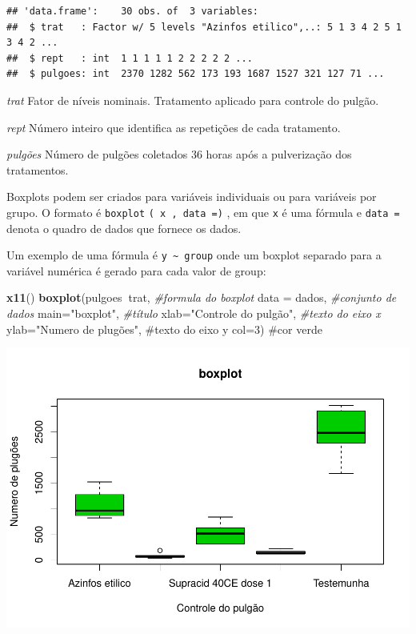 \documentclass[
]{book}
\newenvironment{Shaded}{\begin{snugshade}}{\end{snugshade}}
\newcommand{\CommentTok}[1]{\textcolor[rgb]{0.56,0.35,0.01}{\textit{#1}}}
\newcommand{\DataTypeTok}[1]{\textcolor[rgb]{0.13,0.29,0.53}{#1}}
\newcommand{\KeywordTok}[1]{\textcolor[rgb]{0.13,0.29,0.53}{\textbf{#1}}}
\newcommand{\NormalTok}[1]{#1}
\newcommand{\OperatorTok}[1]{\textcolor[rgb]{0.81,0.36,0.00}{\textbf{#1}}}
\newcommand{\StringTok}[1]{\textcolor[rgb]{0.31,0.60,0.02}{#1}}
\begin{document}
\begin{verbatim}
## 'data.frame':    30 obs. of  3 variables:
##  $ trat   : Factor w/ 5 levels "Azinfos etilico",..: 5 1 3 4 2 5 1 3 4 2 ...
##  $ rept   : int  1 1 1 1 1 2 2 2 2 2 ...
##  $ pulgoes: int  2370 1282 562 173 193 1687 1527 321 127 71 ...
\end{verbatim}

\emph{trat}
Fator de níveis nominais. Tratamento aplicado para controle do pulgão.

\emph{rept}
Número inteiro que identifica as repetições de cada tratamento.

\emph{pulgões}
Número de pulgões coletados 36 horas após a pulverização dos tratamentos.

Boxplots podem ser criados para variáveis individuais ou para variáveis por grupo. O formato é \texttt{boxplot} \texttt{(\ x\ ,\ data\ =)} , em que \texttt{x} é uma fórmula e \texttt{data\ =} denota o quadro de dados que fornece os dados.

Um exemplo de uma fórmula é \texttt{y\ \textasciitilde{}\ group} onde um boxplot separado para a variável numérica é gerado para cada valor de group:

\begin{Shaded}
\begin{Highlighting}[]
\KeywordTok{x11}\NormalTok{()}
\KeywordTok{boxplot}\NormalTok{(pulgoes}\OperatorTok{~}\NormalTok{trat,              }\CommentTok{#formula do boxplot}
        \DataTypeTok{data =}\NormalTok{ dados,              }\CommentTok{#conjunto de dados}
        \DataTypeTok{main=}\StringTok{"boxplot"}\NormalTok{,            }\CommentTok{#título}
        \DataTypeTok{xlab=}\StringTok{"Controle do pulgão"}\NormalTok{, }\CommentTok{#texto do eixo x }
        \DataTypeTok{ylab=}\StringTok{"Numero de plugões",  #texto do eixo y}
\StringTok{        col=3)                     #cor verde  }
\end{Highlighting}
\end{Shaded}

\includegraphics{TudodoR_files/figure-latex/unnamed-chunk-171-1.pdf}
\end{document}
